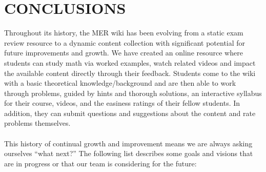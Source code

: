 \documentclass{primus}
\begin{document}
\section{CONCLUSIONS}\label{sec:Conclusions}
Throughout its history, the MER wiki has been evolving from a static exam review resource to a dynamic content collection with significant potential for future improvements and growth.  We have created an online resource where students can study math via worked examples, watch related videos and impact the available content directly through their feedback. Students come to the wiki with a basic theoretical knowledge/background and are then able to work through problems, guided by hints and thorough solutions, an interactive syllabus for their course, videos, and the easiness ratings of their fellow students.  In addition, they can submit questions and suggestions about the content and rate problems themselves.
\\\\  
\noindent{}This history of continual growth and improvement means we are always asking ourselves “what next?”  The following list describes some goals and visions that are in progress or that our team is considering for the future:
\end{document}
